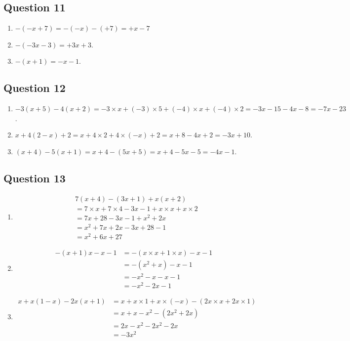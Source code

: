 \documentclass[12 pt]{extarticle}
\theoremstyle{plain}
\begin{document}
\subsection*{Question 11}
\begin{enumerate}
\item $-(-x+7) = -(-x) - (+7) = +x - 7 $
\item $-(-3x-3) = +3x+3$.
\item $-(x+1) = -x -1$.
\end{enumerate}
\subsection*{Question 12}
\begin{enumerate}
\item $-3(x+5) - 4(x+2) = -3\times x + (-3) \times 5 + (-4)\times x+ (-4) \times 2 = -3x-15-4x-8 = -7x-23$.
\item $x+4(2-x)+2 = x+ 4\times 2 + 4\times (-x) + 2 
= x + 8 - 4x +2 = -3x+10$.
\item $(x+4)-5(x+1) = x+4 - (5x+5) = x+4-5x-5 = -4x-1$.
\end{enumerate}
\subsection*{Question 13}
\begin{enumerate}
\item \begin{align*}&7(x+4)-(3x+1)+x(x+2)\\&= 
7\times x + 7\times 4 - 3x - 1 + x \times x + x \times 2\\ 
&= 7x + 28- 3x-1 +x^2 + 2x \\
&= x^2 +7x+2x-3x + 28-1 \\
&= x^2 + 6x+27\end{align*}
\item \begin{align*}
-(x+1)x - x -1 &= -(x\times x + 1\times x) - x -1 \\
&= -(x^2 + x) - x -1 \\
&= -x^2-x-x-1 \\
&= -x^2-2x-1
\end{align*}
\item \begin{align*}
x+x(1-x) -2x(x+1) & = x+ x\times 1 +x \times (-x)
- (2x\times x + 2x \times 1)\\
&= x + x -x^2 -(2x^2 +2x) \\
&= 2x - x^2 - 2x^2 - 2x \\
&= -3x^2
\end{align*}
\end{enumerate}
\end{document}
